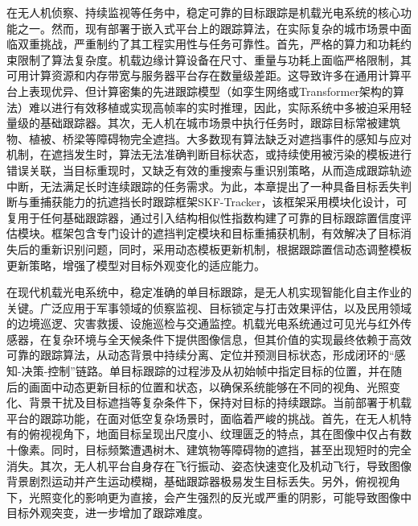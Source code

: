 

在无人机侦察、持续监视等任务中，稳定可靠的目标跟踪是机载光电系统的核心功能之一。然而，现有部署于嵌入式平台上的跟踪算法，在实际复杂的城市场景中面临双重挑战，严重制约了其工程实用性与任务可靠性。首先，严格的算力和功耗约束限制了算法复杂度。机载边缘计算设备在尺寸、重量与功耗上面临严格限制，其可用计算资源和内存带宽与服务器平台存在数量级差距。这导致许多在通用计算平台上表现优异、但计算密集的先进跟踪模型（如孪生网络或Transformer架构的算法）难以进行有效移植或实现高帧率的实时推理，因此，实际系统中多被迫采用轻量级的基础跟踪器。其次，无人机在城市场景中执行任务时，跟踪目标常被建筑物、植被、桥梁等障碍物完全遮挡。大多数现有算法缺乏对遮挡事件的感知与应对机制，在遮挡发生时，算法无法准确判断目标状态，或持续使用被污染的模板进行错误关联，当目标重现时，又缺乏有效的重搜索与重识别策略，从而造成跟踪轨迹中断，无法满足长时连续跟踪的任务需求。为此，本章提出了一种具备目标丢失判断与重捕获能力的抗遮挡长时跟踪框架SKF-Tracker，该框架采用模块化设计，可复用于任何基础跟踪器，通过引入结构相似性指数构建了可靠的目标跟踪置信度评估模块。框架包含专门设计的遮挡判定模块和目标重捕获机制，有效解决了目标消失后的重新识别问题，同时，采用动态模板更新机制，根据跟踪置信动态调整模板更新策略，增强了模型对目标外观变化的适应能力。

在现代机载光电系统中，稳定准确的单目标跟踪，是无人机实现智能化自主作业的关键。广泛应用于军事领域的侦察监视、目标锁定与打击效果评估，以及民用领域的边境巡逻、灾害救援、设施巡检与交通监控。机载光电系统通过可见光与红外传感器，在复杂环境与全天候条件下提供图像信息，但其价值的实现最终依赖于高效可靠的跟踪算法，从动态背景中持续分离、定位并预测目标状态，形成闭环的“感知-决策-控制”链路。单目标跟踪的过程涉及从初始帧中指定目标的位置，并在随后的画面中动态更新目标的位置和状态，以确保系统能够在不同的视角、光照变化、背景干扰及目标遮挡等复杂条件下，保持对目标的持续跟踪。当前部署于机载平台的跟踪功能，在面对低空复杂场景时，面临着严峻的挑战。首先，在无人机特有的俯视视角下，地面目标呈现出尺度小、纹理匮乏的特点，其在图像中仅占有数十像素。同时，目标频繁遭遇树木、建筑物等障碍物的遮挡，甚至出现短时的完全消失。其次，无人机平台自身存在飞行振动、姿态快速变化及机动飞行，导致图像背景剧烈运动并产生运动模糊，基础跟踪器极易发生目标丢失。另外，俯视视角下，光照变化的影响更为直接，会产生强烈的反光或严重的阴影，可能导致图像中目标外观突变，进一步增加了跟踪难度。

